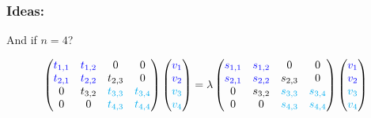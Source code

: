 \documentclass{beamer}
\theoremstyle{definition} \newtheorem{de}{Def}
\theoremstyle{remark} \newtheorem{os}[de]{Remark}
\theoremstyle{plain} \newtheorem{te}[de]{Teo}
\theoremstyle{plain} \newtheorem{co}[de]{Cor}
\theoremstyle{plain} \newtheorem{pr}[de]{Prop}
\theoremstyle{plain} \newtheorem{lem}[de]{Lemm}
\theoremstyle{remark} \newtheorem{rem}[de]{Remark}
\begin{document}
\begin{frame}
  \frametitle{Ideas:}

  And if $n=4$?
  
  \begin{equation*}
    \begin{pmatrix}
      \textcolor{blue}{t_{1,1}} & \textcolor{blue}{t_{1,2}} & 0 & 0\\
      \textcolor{blue}{t_{2,1}} & \textcolor{blue}{t_{2,2}} & t_{2,3} & 0\\
      0 & t_{3,2} & \textcolor{cyan}{t_{3,3}} & \textcolor{cyan}{t_{3,4}}\\
      0 & 0 & \textcolor{cyan}{t_{4,3}} & \textcolor{cyan}{t_{4,4}}
    \end{pmatrix} \begin{pmatrix} 
      \textcolor{blue}{v_1} \\ 
      \textcolor{blue}{v_2} \\
      \textcolor{cyan}{v_3} \\
      \textcolor{cyan}{v_4}
    \end{pmatrix} = \lambda \begin{pmatrix}
      \textcolor{blue}{s_{1,1}} & \textcolor{blue}{s_{1,2}} & 0 & 0\\
      \textcolor{blue}{s_{2,1}} & \textcolor{blue}{s_{2,2}} & s_{2,3} & 0\\
      0 & s_{3,2} & \textcolor{cyan}{s_{3,3}} & \textcolor{cyan}{s_{3,4}}\\
      0 & 0 & \textcolor{cyan}{s_{4,3}} & \textcolor{cyan}{s_{4,4}}
    \end{pmatrix} \begin{pmatrix}
      \textcolor{blue}{v_1} \\ 
      \textcolor{blue}{v_2} \\
      \textcolor{cyan}{v_3} \\
      \textcolor{cyan}{v_4}
    \end{pmatrix}
  \end{equation*}

\end{frame}
\end{document}
